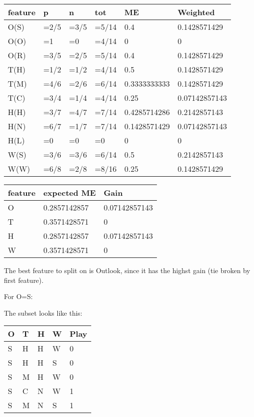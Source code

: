 \documentclass[12pt, fullpage,letterpaper]{article}
\begin{document}
\begin{enumerate}
\begin{enumerate}
\begin{tabular}{|l|l|l|l|l|l|}
	\hline
	feature & p    & n    & tot   & ME           & Weighted      \\ \hline
	O(S)    & =2/5 & =3/5 & =5/14 & 0.4          & 0.1428571429  \\ \hline
	O(O)    & =1   & =0   & =4/14 & 0            & 0             \\ \hline
	O(R)    & =3/5 & =2/5 & =5/14 & 0.4          & 0.1428571429  \\ \hline
	T(H)    & =1/2 & =1/2 & =4/14 & 0.5          & 0.1428571429  \\ \hline
	T(M)    & =4/6 & =2/6 & =6/14 & 0.3333333333 & 0.1428571429  \\ \hline
	T(C)    & =3/4 & =1/4 & =4/14 & 0.25         & 0.07142857143 \\ \hline
	H(H)    & =3/7 & =4/7 & =7/14 & 0.4285714286 & 0.2142857143  \\ \hline
	H(N)    & =6/7 & =1/7 & =7/14 & 0.1428571429 & 0.07142857143 \\ \hline
	H(L)    & =0   & =0   & =0    & 0            & 0             \\ \hline
	W(S)    & =3/6 & =3/6 & =6/14 & 0.5          & 0.2142857143  \\ \hline
	W(W)    & =6/8 & =2/8 & =8/16 & 0.25         & 0.1428571429   \\ \hline
	\end{tabular}

	\begin{tabular}{|l|l|l|}
		\hline
		feature & expected ME  & Gain          \\ \hline
		O       & 0.2857142857 & 0.07142857143 \\ \hline
		T       & 0.3571428571 & 0             \\ \hline
		H       & 0.2857142857 & 0.07142857143 \\ \hline
		W       & 0.3571428571 & 0			   \\ \hline
		\end{tabular}


		The best feature to split on is Outlook, since it has the highst gain (tie broken by first feature). 

		For O=S:
		
		The subset looks like this:
		
		\begin{tabular}{|l|l|l|l|l|}
			\hline
			O & T & H & W & Play \\ \hline
			S & H & H & W & 0    \\ \hline
			S & H & H & S & 0    \\ \hline
			S & M & H & W & 0    \\ \hline
			S & C & N & W & 1    \\ \hline
			S & M & N & S & 1    \\ \hline
			\end{tabular}
		

\end{enumerate}
\end{enumerate}
\end{document}
